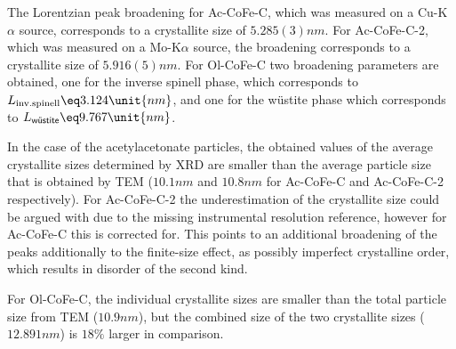 \documentclass[\main/dresen_thesis.tex]{subfiles}
\begin{document}
    The Lorentzian peak broadening for Ac-CoFe-C, which was measured on a Cu-K$\alpha$ source, corresponds to a crystallite size of $5.285(3) \unit{nm}$.
    For Ac-CoFe-C-2, which was measured on a Mo-K$\alpha$ source, the broadening corresponds to a crystallite size of $5.916(5) \unit{nm}$.
    For Ol-CoFe-C two broadening parameters are obtained, one for the inverse spinell phase, which corresponds to $L_{\mathrm{inv. spinell}} \eq 3.124 \unit{nm}$, and one for the w\"ustite phase which corresponds to $L_{\textsf{w\"ustite}} \eq 9.767 \unit{nm}$.

    In the case of the acetylacetonate particles, the obtained values of the average crystallite sizes determined by XRD are smaller than the average particle size that is obtained by TEM ($10.1 \unit{nm}$ and $10.8 \unit{nm}$ for Ac-CoFe-C and Ac-CoFe-C-2 respectively).
    For Ac-CoFe-C-2 the underestimation of the crystallite size could be argued with due to the missing instrumental resolution reference, however for Ac-CoFe-C this is corrected for.
    This points to an additional broadening of the peaks additionally to the finite-size effect, as possibly imperfect crystalline order, which results in disorder of the second kind.

    For Ol-CoFe-C, the individual crystallite sizes are smaller than the total particle size from TEM ($10.9 \unit{nm}$), but the combined size of the two crystallite sizes ($12.891 \unit{nm}$) is $18 \%$ larger in comparison.

\end{document}
